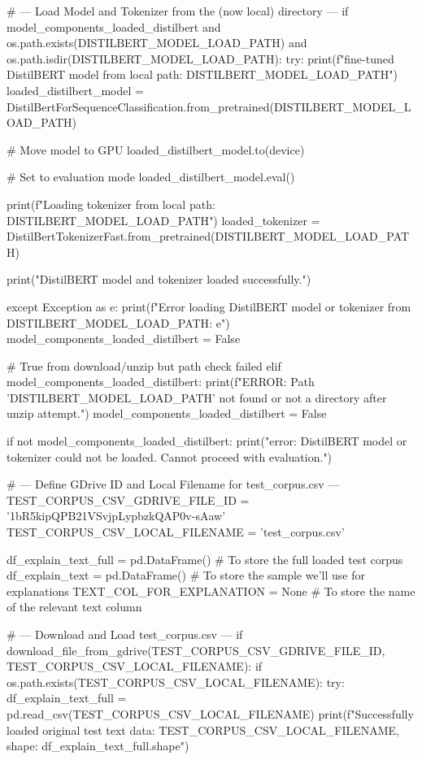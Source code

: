 \begin{ffcode}
# --- Load Model and Tokenizer from the (now local) directory ---
if model_components_loaded_distilbert and os.path.exists(DISTILBERT_MODEL_LOAD_PATH) and os.path.isdir(DISTILBERT_MODEL_LOAD_PATH):
    try:
        print(f"\nLoading fine-tuned DistilBERT model from local path: {DISTILBERT_MODEL_LOAD_PATH}")
        loaded_distilbert_model = DistilBertForSequenceClassification.from_pretrained(DISTILBERT_MODEL_LOAD_PATH)

        # Move model to GPU
        loaded_distilbert_model.to(device)

        # Set to evaluation mode
        loaded_distilbert_model.eval()

        print(f"Loading tokenizer from local path: {DISTILBERT_MODEL_LOAD_PATH}")
        loaded_tokenizer = DistilBertTokenizerFast.from_pretrained(DISTILBERT_MODEL_LOAD_PATH)

        print("DistilBERT model and tokenizer loaded successfully.")

    except Exception as e:
        print(f"Error loading DistilBERT model or tokenizer from {DISTILBERT_MODEL_LOAD_PATH}: {e}")
        model_components_loaded_distilbert = False

# True from download/unzip but path check failed
elif model_components_loaded_distilbert:
    print(f"ERROR: Path '{DISTILBERT_MODEL_LOAD_PATH}' not found or not a directory after unzip attempt.")
    model_components_loaded_distilbert = False

if not model_components_loaded_distilbert:
    print("\nCritical error: DistilBERT model or tokenizer could not be loaded. Cannot proceed with evaluation.")

# --- Define GDrive ID and Local Filename for test_corpus.csv ---
TEST_CORPUS_CSV_GDRIVE_FILE_ID = '1bR5kipQPB21VSvjpLypbzkQAP0v-sAaw'
TEST_CORPUS_CSV_LOCAL_FILENAME = 'test_corpus.csv'

df_explain_text_full = pd.DataFrame() # To store the full loaded test corpus
df_explain_text = pd.DataFrame()      # To store the sample we'll use for explanations
TEXT_COL_FOR_EXPLANATION = None       # To store the name of the relevant text column

# --- Download and Load test_corpus.csv ---
if download_file_from_gdrive(TEST_CORPUS_CSV_GDRIVE_FILE_ID, TEST_CORPUS_CSV_LOCAL_FILENAME):
    if os.path.exists(TEST_CORPUS_CSV_LOCAL_FILENAME):
        try:
            df_explain_text_full = pd.read_csv(TEST_CORPUS_CSV_LOCAL_FILENAME)
            print(f"Successfully loaded original test text data: {TEST_CORPUS_CSV_LOCAL_FILENAME}, shape: {df_explain_text_full.shape}")


\end{ffcode}
